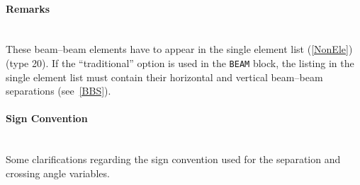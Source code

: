 \paragraph{Remarks}~\\

These beam--beam elements have to appear in the single element list (\ref{NonEle}) (type 20).
If the ``traditional'' option is used in the \texttt{BEAM} block, the listing in the single element list must contain their horizontal and vertical beam--beam separations (see~\ref{BBS}).

\paragraph{Sign Convention}~\\

Some clarifications regarding the sign convention used for the separation and crossing angle variables.

